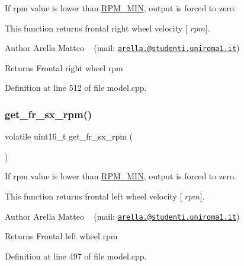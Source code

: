 If rpm value is lower than \mbox{\hyperlink{group___board__model__group_gafc05771487f188ffa40b6620afc1a9bc}{R\+P\+M\+\_\+\+M\+IN}}, output is forced to zero. 

This function returns frontal right wheel velocity \mbox{[} $rpm$\mbox{]}.

\begin{DoxyAuthor}{Author}
Arella Matteo ~\newline
 (mail\+: \href{mailto:arella.1646983@studenti.uniroma1.it}{\tt arella.@studenti.\+uniroma1.\+it})
\end{DoxyAuthor}
\begin{DoxyReturn}{Returns}
Frontal right wheel rpm 
\end{DoxyReturn}


Definition at line 512 of file model.\+cpp.

\mbox{\label{group___board__model__group_ga77eb7343baa6cbfd81673dcbd03ac125}} 
\subsubsection{\texorpdfstring{get\+\_\+fr\+\_\+sx\+\_\+rpm()}{get\_fr\_sx\_rpm()}}
{\footnotesize\ttfamily volatile uint16\+\_\+t get\+\_\+fr\+\_\+sx\+\_\+rpm (\begin{DoxyParamCaption}{ }\end{DoxyParamCaption})}



If rpm value is lower than \mbox{\hyperlink{group___board__model__group_gafc05771487f188ffa40b6620afc1a9bc}{R\+P\+M\+\_\+\+M\+IN}}, output is forced to zero. 

This function returns frontal left wheel velocity \mbox{[} $rpm$\mbox{]}.

\begin{DoxyAuthor}{Author}
Arella Matteo ~\newline
 (mail\+: \href{mailto:arella.1646983@studenti.uniroma1.it}{\tt arella.@studenti.\+uniroma1.\+it})
\end{DoxyAuthor}
\begin{DoxyReturn}{Returns}
Frontal left wheel rpm 
\end{DoxyReturn}


Definition at line 497 of file model.\+cpp.

